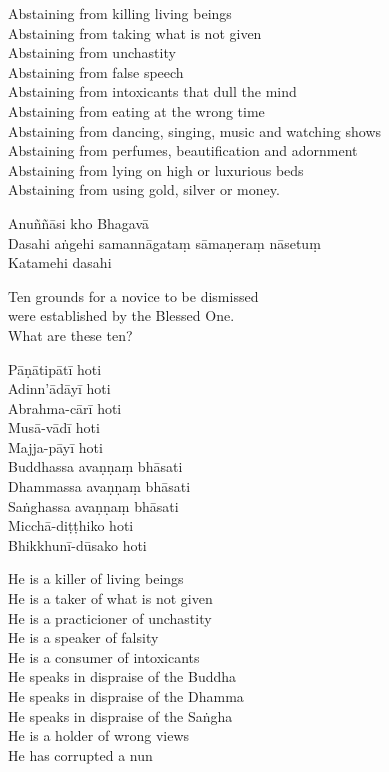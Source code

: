 \begin{english}
  Abstaining from killing living beings\\
  Abstaining from taking what is not given\\
  Abstaining from unchastity\\
  Abstaining from false speech\\
  Abstaining from intoxicants that dull the mind\\
  Abstaining from eating at the wrong time\\
  Abstaining from dancing, singing, music and watching shows\\
  Abstaining from perfumes, beautification and adornment\\
  Abstaining from lying on high or luxurious beds\\
  Abstaining from using gold, silver or money.
\end{english}


\clearpage

Anuññāsi kho Bhagavā\\
Dasahi aṅgehi samannāgataṃ sāmaṇeraṃ nāsetuṃ\\
Katamehi dasahi

\begin{english}
  Ten grounds for a novice to be dismissed\\
  were established by the Blessed One.\\
  What are these ten?
\end{english}

Pāṇātipātī hoti\\
Adinn'ādāyī hoti\\
Abrahma-cārī hoti\\
Musā-vādī hoti\\
Majja-pāyī hoti\\
Buddhassa avaṇṇaṃ bhāsati\\
Dhammassa avaṇṇaṃ bhāsati\\
Saṅghassa avaṇṇaṃ bhāsati\\
Micchā-diṭṭhiko hoti\\
Bhikkhunī-dūsako hoti

\begin{english}
  He is a killer of living beings\\
  He is a taker of what is not given\\
  He is a practicioner of unchastity\\
  He is a speaker of falsity\\
  He is a consumer of intoxicants\\
  He speaks in dispraise of the Buddha\\
  He speaks in dispraise of the Dhamma\\
  He speaks in dispraise of the Saṅgha\\
  He is a holder of wrong views\\
  He has corrupted a nun
\end{english}


